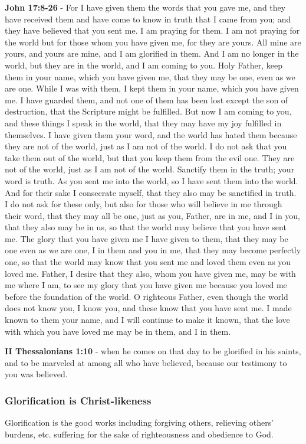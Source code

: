 \documentclass[11pt]{article}
\begin{document}
\textbf{John 17:8-26} - For I have given them the words that you gave me, and they have received them and have come to know in truth that I came from you; and they have believed that you sent me.  I am praying for them. I am not praying for the world but for those whom you have given me, for they are yours.  All mine are yours, and yours are mine, and I am glorified in them.  And I am no longer in the world, but they are in the world, and I am coming to you. Holy Father, keep them in your name, which you have given me, that they may be one, even as we are one.  While I was with them, I kept them in your name, which you have given me. I have guarded them, and not one of them has been lost except the son of destruction, that the Scripture might be fulfilled.  But now I am coming to you, and these things I speak in the world, that they may have my joy fulfilled in themselves.  I have given them your word, and the world has hated them because they are not of the world, just as I am not of the world.  I do not ask that you take them out of the world, but that you keep them from the evil one.  They are not of the world, just as I am not of the world.  Sanctify them in the truth; your word is truth.  As you sent me into the world, so I have sent them into the world.  And for their sake I consecrate myself, that they also may be sanctified in truth.  I do not ask for these only, but also for those who will believe in me through their word, that they may all be one, just as you, Father, are in me, and I in you, that they also may be in us, so that the world may believe that you have sent me.  The glory that you have given me I have given to them, that they may be one even as we are one, I in them and you in me, that they may become perfectly one, so that the world may know that you sent me and loved them even as you loved me.  Father, I desire that they also, whom you have given me, may be with me where I am, to see my glory that you have given me because you loved me before the foundation of the world.  O righteous Father, even though the world does not know you, I know you, and these know that you have sent me.  I made known to them your name, and I will continue to make it known, that the love with which you have loved me may be in them, and I in them.

\textbf{II Thessalonians 1:10} - when he comes on that day to be glorified in his saints, and to be marveled at among all who have believed, because our testimony to you was believed.

\subsubsection{Glorification is Christ-likeness}
\label{sec:org3d9b493}
Glorification is the good works including forgiving others, relieving others' burdens, etc. suffering for the sake of righteousness and obedience to God.
\end{document}
